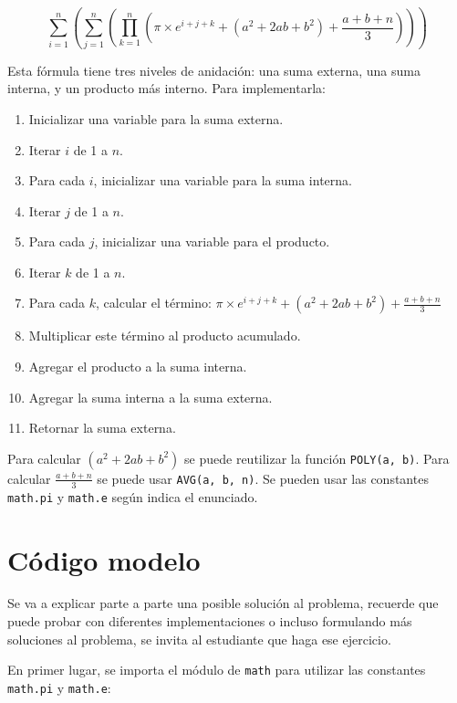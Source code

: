 \documentclass{article}
\begin{document}
\[
\sum_{i=1}^{n}
\left(
\sum_{j=1}^{n}
\left(
\prod_{k=1}^{n}
\left(\pi \times e^{i + j +k} +  (a^2 + 2ab + b^2) + \frac{a + b + n}{3} \right)
\right)
\right)
\]

Esta fórmula tiene tres niveles de anidación: una suma externa, una suma interna, y un producto más interno. Para implementarla:

\begin{enumerate}
  \item Inicializar una variable para la suma externa.
  \item Iterar \(i\) de 1 a \(n\).
  \item Para cada \(i\), inicializar una variable para la suma interna.
  \item Iterar \(j\) de 1 a \(n\).
  \item Para cada \(j\), inicializar una variable para el producto.
  \item Iterar \(k\) de 1 a \(n\).
  \item Para cada \(k\), calcular el término: \(\pi \times e^{i + j +k} +  (a^2 + 2ab + b^2) + \frac{a + b + n}{3}\)
  \item Multiplicar este término al producto acumulado.
  \item Agregar el producto a la suma interna.
  \item Agregar la suma interna a la suma externa.
  \item Retornar la suma externa.
\end{enumerate}

Para calcular \((a^2 + 2ab + b^2)\) se puede reutilizar la función \texttt{POLY(a, b)}. Para calcular \(\frac{a + b + n}{3}\) se puede usar \texttt{AVG(a, b, n)}. Se pueden usar las constantes \lstinline[style=pythonstyle]|math.pi| y \lstinline[style=pythonstyle]|math.e| según indica el enunciado.

\section{Código modelo}
\label{sec:codigo}

Se va a explicar parte a parte una posible solución al problema, recuerde que puede probar con diferentes implementaciones o incluso formulando más soluciones al problema, se invita al estudiante que haga ese ejercicio.

En primer lugar, se importa el módulo de \lstinline[style=pythonstyle]|math| para utilizar las constantes \lstinline[style=pythonstyle]|math.pi| y \lstinline[style=pythonstyle]|math.e|:
\end{document}
